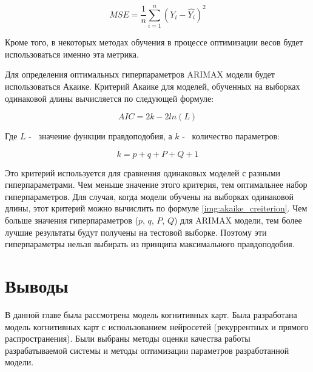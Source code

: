 \begin{equation}\label{eq:mse}
	MSE = \frac{1}{n} \sum_{i=1}^{n} (Y_i  - \hat{Y_i})^2
\end{equation}

\noindent Кроме того, в некоторых методах обучения
в процессе оптимизации весов будет использоваться именно эта метрика.


Для определения оптимальных гиперпараметров ARIMAX модели будет использоваться Акаике.
Критерий Акаике для моделей, обученных на выборках одинаковой длины вычисляется по следующей
формуле:

\begin{equation}\label{eq:akaike}
	AIC = 2k - 2 ln(L)
\end{equation}

\noindent Где $ L $ -~ значение функции правдоподобия,
а $ k $ -~ количество параметров:

\begin{equation}\label{eq:params_amount_akaike}
	k = p + q + P + Q + 1
\end{equation}

Это критерий используется для сравнения одинаковых моделей с разными гиперпараметрами.
Чем меньше значение этого критерия, тем оптимальнее набор гиперпараметров.
Для случая, когда модели обучены на выборках одинаковой длины, этот критерий можно вычислить по формуле \ref{img:akaike_creiterion}.
Чем больше значения гиперпараметров ($ p $, $ q $, $ P $, $ Q $) для ARIMAX модели, тем более лучшие
результаты будут получены на тестовой выборке. Поэтому эти гиперпараметры нельзя
выбирать из принципа максимального правдоподобия.

\section{Выводы}

В данной главе была рассмотрена модель когнитивных карт.
Была разработана модель когнитивных карт
с использованием нейросетей (рекуррентных и прямого распространения).
Были выбраны методы оценки качества работы разрабатываемой системы
и методы оптимизации параметров разработанной модели.